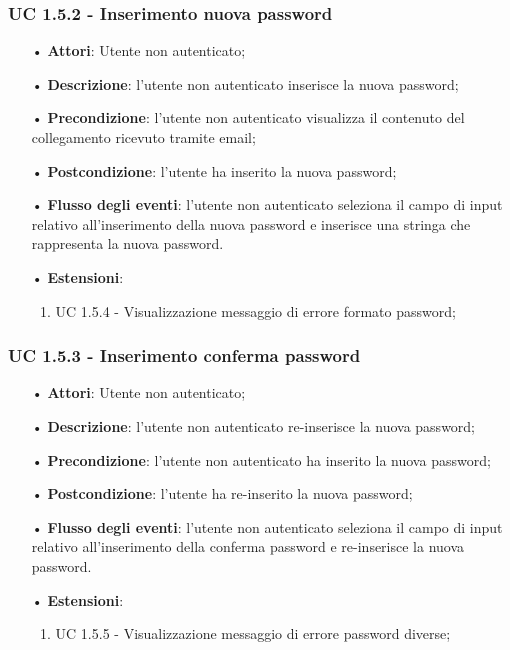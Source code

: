 \subsubsection{UC 1.5.2 - Inserimento nuova password}
\begin{itemize}
	\item[•]\textbf{Attori}: Utente non autenticato;
	\item[•]\textbf{Descrizione}: l’utente non autenticato inserisce la nuova password;
	\item[•]\textbf{Precondizione}: l’utente non autenticato visualizza il contenuto del collegamento ricevuto tramite email;
	\item[•]\textbf{Postcondizione}: l'utente ha inserito la nuova password;
	\item[•]\textbf{Flusso degli eventi}: l'utente non autenticato seleziona il campo di input relativo all'inserimento della nuova password e inserisce una stringa che rappresenta la nuova password.
	\item[•]\textbf{Estensioni}:
	\begin{enumerate}
		\item UC 1.5.4 - Visualizzazione messaggio di errore formato password;
	\end{enumerate}
\end{itemize}

\subsubsection{UC 1.5.3 - Inserimento conferma password}
\begin{itemize}
	\item[•]\textbf{Attori}: Utente non autenticato;
	\item[•]\textbf{Descrizione}: l’utente non autenticato re-inserisce la nuova password;
	\item[•]\textbf{Precondizione}: l’utente non autenticato ha inserito la nuova password;
	\item[•]\textbf{Postcondizione}: l'utente ha re-inserito la nuova password;
	\item[•]\textbf{Flusso degli eventi}: l'utente non autenticato seleziona il campo di input relativo all'inserimento della conferma password e re-inserisce la nuova password.
	\item[•]\textbf{Estensioni}:
	\begin{enumerate}
		\item UC 1.5.5 - Visualizzazione messaggio di errore password diverse;
	\end{enumerate}
\end{itemize}

